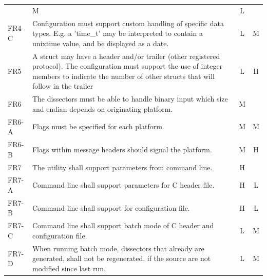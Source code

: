 \begin{table}[htbp]
{\begin{tabularx}{1.2\textwidth}{l X c c}
		& M & L \\
	FR4-C & Configuration must support custom handling of specific data
		types. E.g. a 'time\_t' may be interpreted to contain a unixtime value,
		and be displayed as a date.
		& L & M \\
	\midrule
	FR5 & A struct may have a header and/or trailer (other registered
		protocol). The configuration must support the use of integer members to
		indicate the number of other structs that will follow in the trailer
		& L & H \\
	\midrule
	FR6 & The dissectors must be able to handle binary input which size
		and endian depends on originating platform.
		& M & \\
	FR6-A & Flags must be specified for each platform.
		& M & M \\
	FR6-B & Flags within message headers should signal the platform.
		& M & H \\
	\midrule
	FR7 & The utility shall support parameters from command line.
		& H & \\
	FR7-A & Command line shall support parameters for C header file.
		& H & L \\
	FR7-B & Command line shall support for configuration file.
		& H & L \\
	FR7-C & Command line shall support batch mode of C header and
		configuration file.
		& L & M \\
	FR7-D & When running batch mode, dissectors that already are
		generated, shall not be regenerated, if the source are not modified
		since last run.
		& L & M \\
	\bottomrule
\end{tabularx}}
\end{table}

